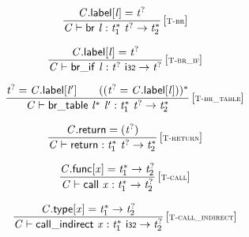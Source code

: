 \vspace{1ex}

$$
\begin{array}{@{}c@{}}\displaystyle
\frac{
{\mathit{C}}.\mathsf{label}{}[{\mathit{l}}] = {{\mathit{t}}^?}
}{
{\mathit{C}} \vdash \mathsf{br}~{\mathit{l}} : {{\mathit{t}}_{{1}}^\ast}~{{\mathit{t}}^?} \rightarrow {{\mathit{t}}_{{2}}^\ast}
} \, {[\textsc{\scriptsize T{-}br}]}
\qquad
\end{array}
$$

$$
\begin{array}{@{}c@{}}\displaystyle
\frac{
{\mathit{C}}.\mathsf{label}{}[{\mathit{l}}] = {{\mathit{t}}^?}
}{
{\mathit{C}} \vdash \mathsf{br\_if}~{\mathit{l}} : {{\mathit{t}}^?}~\mathsf{i{\scriptstyle32}} \rightarrow {{\mathit{t}}^?}
} \, {[\textsc{\scriptsize T{-}br\_if}]}
\qquad
\end{array}
$$

$$
\begin{array}{@{}c@{}}\displaystyle
\frac{
{{\mathit{t}}^?} = {\mathit{C}}.\mathsf{label}{}[{\mathit{l}'}]
 \qquad
(({{\mathit{t}}^?} = {\mathit{C}}.\mathsf{label}{}[{\mathit{l}}]))^\ast
}{
{\mathit{C}} \vdash \mathsf{br\_table}~{{\mathit{l}}^\ast}~{\mathit{l}'} : {{\mathit{t}}_{{1}}^\ast}~{{\mathit{t}}^?} \rightarrow {{\mathit{t}}_{{2}}^\ast}
} \, {[\textsc{\scriptsize T{-}br\_table}]}
\qquad
\end{array}
$$

\vspace{1ex}

$$
\begin{array}{@{}c@{}}\displaystyle
\frac{
{\mathit{C}}.\mathsf{return} = ({{\mathit{t}}^?})
}{
{\mathit{C}} \vdash \mathsf{return} : {{\mathit{t}}_{{1}}^\ast}~{{\mathit{t}}^?} \rightarrow {{\mathit{t}}_{{2}}^\ast}
} \, {[\textsc{\scriptsize T{-}return}]}
\qquad
\end{array}
$$

$$
\begin{array}{@{}c@{}}\displaystyle
\frac{
{\mathit{C}}.\mathsf{func}{}[{\mathit{x}}] = {{\mathit{t}}_{{1}}^\ast} \rightarrow {{\mathit{t}}_{{2}}^?}
}{
{\mathit{C}} \vdash \mathsf{call}~{\mathit{x}} : {{\mathit{t}}_{{1}}^\ast} \rightarrow {{\mathit{t}}_{{2}}^?}
} \, {[\textsc{\scriptsize T{-}call}]}
\qquad
\end{array}
$$

$$
\begin{array}{@{}c@{}}\displaystyle
\frac{
{\mathit{C}}.\mathsf{type}{}[{\mathit{x}}] = {{\mathit{t}}_{{1}}^\ast} \rightarrow {{\mathit{t}}_{{2}}^?}
}{
{\mathit{C}} \vdash \mathsf{call\_indirect}~{\mathit{x}} : {{\mathit{t}}_{{1}}^\ast}~\mathsf{i{\scriptstyle32}} \rightarrow {{\mathit{t}}_{{2}}^?}
} \, {[\textsc{\scriptsize T{-}call\_indirect}]}
\qquad
\end{array}
$$

